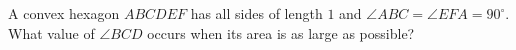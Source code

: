 A convex hexagon $ABCDEF$ has all sides of length $1$ and $\angle ABC=\angle EFA=90^\circ$. What value of $\angle BCD$ occurs when its area is as large as possible?
